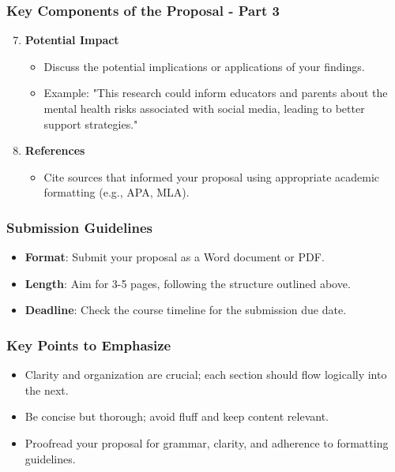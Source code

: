 \documentclass{beamer}
\begin{document}
\begin{frame}[fragile]
    \frametitle{Key Components of the Proposal - Part 3}
    \begin{enumerate}
        \setcounter{enumi}{6}
        \item \textbf{Potential Impact}
            \begin{itemize}
                \item Discuss the potential implications or applications of your findings.
                \item Example: "This research could inform educators and parents about the mental health risks associated with social media, leading to better support strategies."
            \end{itemize}

        \item \textbf{References}
            \begin{itemize}
                \item Cite sources that informed your proposal using appropriate academic formatting (e.g., APA, MLA).
            \end{itemize}
    \end{enumerate}
\end{frame}

\begin{frame}[fragile]
    \frametitle{Submission Guidelines}
    \begin{itemize}
        \item \textbf{Format}: Submit your proposal as a Word document or PDF.
        \item \textbf{Length}: Aim for 3-5 pages, following the structure outlined above.
        \item \textbf{Deadline}: Check the course timeline for the submission due date.
    \end{itemize}
\end{frame}

\begin{frame}[fragile]
    \frametitle{Key Points to Emphasize}
    \begin{itemize}
        \item Clarity and organization are crucial; each section should flow logically into the next.
        \item Be concise but thorough; avoid fluff and keep content relevant.
        \item Proofread your proposal for grammar, clarity, and adherence to formatting guidelines.
    \end{itemize}
\end{frame}
\end{document}
